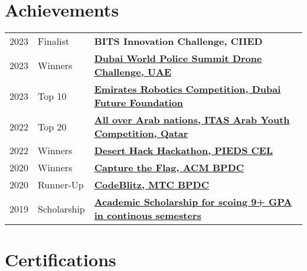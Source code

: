 \documentclass[letterpaper]{deedy-resume} %
\begin{document}
\begin{minipage}[t]{0.66\textwidth}
\sectionspace %


\vspace{-2.5mm}

\section{Achievements} 

\begin{tabular}{rll}
2023 & Finalist & \textbf{BITS Innovation Challenge, CIIED} \\
2023	 & Winners & \href{https://drive.google.com/file/d/1V15hoDV0UpswjvM_AWuVv6spCsZBnf9v/view?usp=sharing}{\textbf{Dubai World Police Summit Drone Challenge, UAE}}\\
2023	 & Top 10 & \href{https://drive.google.com/file/d/11H2myWdhnscxp_EaSFCTdD0XtpjvV3WP/view?usp=sharing}{\textbf{Emirates Robotics Competition, Dubai Future Foundation}}\\
2022	 & Top 20 & \href{https://drive.google.com/file/d/1vFYthSRHosbvXcAq3cGG7ietVRNWMicv/view?usp=sharing}{\textbf{All over Arab nations, ITAS Arab Youth Competition, Qatar}}\\
2022	 & Winners & \href{https://drive.google.com/file/d/1sTuFG7BcEsMlxpYFhXq5B9ge4OBBptz8/view?usp=sharing}{\textbf{Desert Hack Hackathon, PIEDS CEL}}\\
2020 & Winners &\href{https://drive.google.com/file/d/17OFbdtE_pLCXyYPvsOqMQuBfj0whuk_7/view?usp=sharing}{\textbf{Capture the Flag, ACM BPDC}} \\
2020 & Runner-Up & \href{https://drive.google.com/file/d/1W-NDmQ6rTAV1vm8FDRquylfX5VINKUwx/view?usp=sharing}{\textbf{CodeBlitz, MTC BPDC}} \\
2019 & Scholarship & \href{https://drive.google.com/file/d/1z-0qJ_CAw92YtE0-86peKLZQVTs-ugfI/view?usp=sharing}{\textbf{Academic Scholarship for scoing 9+ GPA in continous semesters}} \\
\end{tabular}

\sectionspace %


\vspace{-2.5mm}

\section{Certifications } 


\end{minipage}
\end{document}
